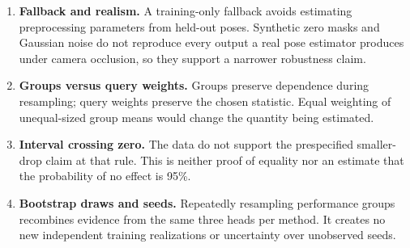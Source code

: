 \begin{enumerate}[label=\textbf{\arabic*.},leftmargin=2em]
or nested mask makes a stronger level a controlled strengthening of the same
damage. Unrelated draws could obscure the effect of increasing severity.
\item \textbf{Fallback and realism.} A training-only fallback avoids estimating
preprocessing parameters from held-out poses. Synthetic zero masks and Gaussian
noise do not reproduce every output a real pose estimator produces under camera
occlusion, so they support a narrower robustness claim.
\item \textbf{Groups versus query weights.} Groups preserve dependence during
resampling; query weights preserve the chosen statistic. Equal weighting of
unequal-sized group means would change the quantity being estimated.
\item \textbf{Interval crossing zero.} The data do not support the prespecified
smaller-drop claim at that rule. This is neither proof of equality nor an
estimate that the probability of no effect is 95\%.
\item \textbf{Bootstrap draws and seeds.} Repeatedly resampling performance
groups recombines evidence from the same three heads per method. It creates no
new independent training realizations or uncertainty over unobserved seeds.
\end{enumerate}

